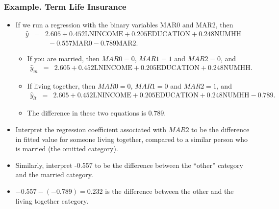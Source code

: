 \begin{frame}[shrink=5]
 \frametitle{Example. Term Life Insurance}
  \begin{itemize}
   \item If we run a regression with the binary variables MAR0 and
   MAR2, then
\begin{eqnarray*}
\widehat{y} &=& 2.605 + 0.452 \textrm{LNINCOME} +0.205
\textrm{EDUCATION} + 0.248 \textrm{NUMHH} \\
 & & ~~ -0.557 \textrm{MAR0} -0.789 \textrm{MAR2}.
\end{eqnarray*}
\begin{itemize}
\item If you are married, then $MAR0=0$, $MAR1=1$ and $MAR2=0$, and
\begin{eqnarray*}
\widehat{y}_m &=& 2.605 + 0.452 \textrm{LNINCOME} +0.205
\textrm{EDUCATION} + 0.248 \textrm{NUMHH} .
\end{eqnarray*}
\item If living together, then $MAR0=0$, $MAR1=0$ and $MAR2=1$, and
   \begin{eqnarray*}
\widehat{y}_{lt} &=& 2.605 + 0.452 \textrm{LNINCOME} +0.205
\textrm{EDUCATION} + 0.248 \textrm{NUMHH} -0.789.
\end{eqnarray*}
\item The difference in these two equations is $0.789.$
\end{itemize}
\item Interpret the regression coefficient associated with
$MAR2$ to be the difference in fitted value for someone living
together, compared to a similar person who is married (the omitted
category).
\item Similarly, interpret -0.557 to be the difference between the
``other'' category and the married category.
\item $-0.557 - (-0.789) = 0.232$ is the difference between the
other and the living together category.
     \end{itemize}
\end{frame}

